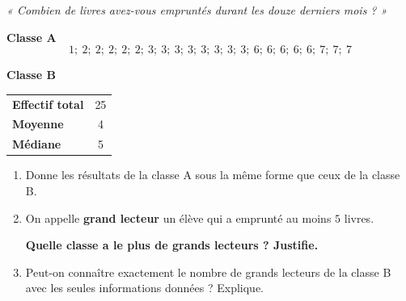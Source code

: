 \documentclass[12pt,a4paper]{article}
\newcommand{\blocdonnees}[1]{%
  \begin{tcolorbox}[mathsbox,colback=NeutreBg,colframe=NeutreC!45,boxrule=0.6pt,arc=2mm]
  #1
  \end{tcolorbox}
}
\begin{document}
\begin{center}
\textit{« Combien de livres avez-vous empruntés durant les douze derniers mois ? »}
\end{center}

\blocdonnees{
\textbf{Classe A}
\[
1;\ 2;\ 2;\ 2;\ 2;\ 2;\ 3;\ 3;\ 3;\ 3;\ 3;\ 3;\ 3;\ 3;\ 6;\ 6;\ 6;\ 6;\ 6;\ 7;\ 7;\ 7
\]

\medskip
\textbf{Classe B}

\begin{center}
\begin{tabular}{>{\bfseries}l c}
Effectif total & 25\\
Moyenne & 4\\
Médiane & 5
\end{tabular}
\end{center}
}

\begin{enumerate}
  \item Donne les résultats de la classe A sous la même forme que ceux de la classe B.

  \item On appelle \textbf{grand lecteur} un élève qui a emprunté au moins \(5\) livres.

  \textbf{Quelle classe a le plus de grands lecteurs ? Justifie.}

  \item Peut-on connaître exactement le nombre de grands lecteurs de la classe B avec les seules informations données ? Explique.
\end{enumerate}

\end{document}
